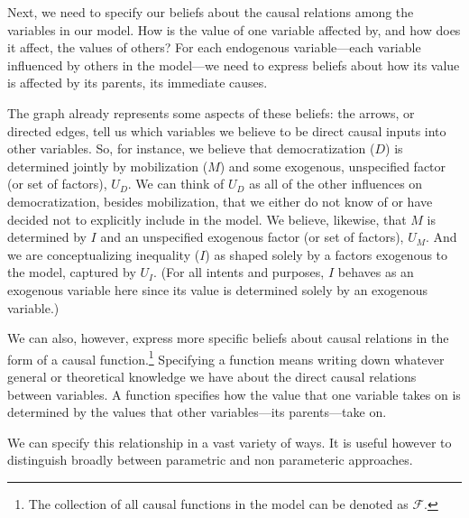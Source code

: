 \documentclass[12pt,]{book}
\let\rmarkdownfootnote\footnote%
\def\footnote{\protect\rmarkdownfootnote}
\begin{document}
Next, we need to specify our beliefs about the causal relations among the variables in our model. How is the value of one variable affected by, and how does it affect, the values of others? For each endogenous variable---each variable influenced by others in the model---we need to express beliefs about how its value is affected by its parents, its immediate causes.

The graph already represents some aspects of these beliefs: the arrows, or directed edges, tell us which variables we believe to be direct causal inputs into other variables. So, for instance, we believe that democratization (\(D\)) is determined jointly by mobilization (\(M\)) and some exogenous, unspecified factor (or set of factors), \(U_D\). We can think of \(U_D\) as all of the other influences on democratization, besides mobilization, that we either do not know of or have decided not to explicitly include in the model. We believe, likewise, that \(M\) is determined by \(I\) and an unspecified exogenous factor (or set of factors), \(U_M\). And we are conceptualizing inequality (\(I\)) as shaped solely by a factors exogenous to the model, captured by \(U_I\). (For all intents and purposes, \(I\) behaves as an exogenous variable here since its value is determined solely by an exogenous variable.)

We can also, however, express more specific beliefs about causal relations in the form of a causal function.\footnote{The collection of all causal functions in the model can be denoted as \(\mathcal{F}\).} Specifying a function means writing down whatever general or theoretical knowledge we have about the direct causal relations between variables. A function specifies how the value that one variable takes on is determined by the values that other variables---its parents---take on.

We can specify this relationship in a vast variety of ways. It is useful however to distinguish broadly between parametric and non parameteric approaches.
\end{document}
